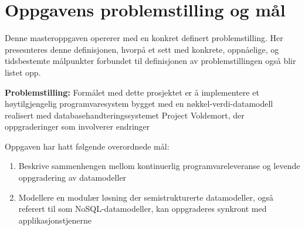 \section{Oppgavens problemstilling og mål}

Denne masteroppgaven opererer med en konkret definert problemstilling. Her presesnteres denne definisjonen, hvorpå et sett med konkrete, oppnåelige, og tidsbestemte målpunkter forbundet til definisjonen av problemstillingen også blir listet opp.

\textbf{Problemstilling:} Formålet med dette prosjektet er å implementere et høytilgjengelig programvaresystem bygget med en nøkkel-verdi-datamodell realisert med databasehandteringssystemet Project Voldemort, der oppgraderinger som involverer endringer 

Oppgaven har hatt følgende overordnede mål:

\begin{enumerate}
  \item Beskrive sammenhengen mellom kontinuerlig programvareleveranse og levende oppgradering av datamodeller %
  \item Modellere en modulær løsning der semistrukturerte datamodeller, også referert til som NoSQL-datamodeller, kan oppgraderes synkront med applikasjonstjenerne
\end{enumerate}




